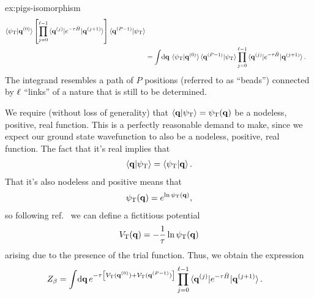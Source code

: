 \begin{DefAnswer}{ex:pigs-isomorphism}
\begin{subequations}
\begin{align}
			\braket{\psiT | \vec{q}\bead{0}}
			\left[ \prod_{j=0}^{\links - 1}
				\braket{\vec{q}\bead{j} | e^{-\tau \hat{H}} | \vec{q}\bead{j+1}}
			\right]
			\braket{\vec{q}\bead{P-1} | \psiT} \\
		&= \int\! \dif \vec{q} \,
			\braket{\psiT | \vec{q}\bead{0}}
			\braket{\vec{q}\bead{P-1} | \psiT}
			\prod_{j=0}^{\links - 1}
				\braket{\vec{q}\bead{j} | e^{-\tau \hat{H}} | \vec{q}\bead{j+1}}.
	\end{align}
	\end{subequations}
	The integrand resembles a path of $P$ positions (referred to as ``beads'') connected by $\ell$ ``links'' of a nature that is still to be determined.

	We require (without loss of generality) that $\braket{\bm{\mathbf{q}} | \psi_\mathrm{T}} = \psi_\mathrm{T}(\bm{\mathbf{q}})$ be a nodeless, positive, real function.
	This is a perfectly reasonable demand to make, since we expect our ground state wavefunction to also be a nodeless, positive, real function.
	The fact that it's real implies that
	\begin{align}
		\braket{\bm{\mathbf{q}} | \psi_\mathrm{T}} = \braket{\psi_\mathrm{T} | \bm{\mathbf{q}}}.
	\end{align}
	That it's also nodeless and positive means that
	\begin{align}
		\psi_\mathrm{T}(\bm{\mathbf{q}}) = e^{\ln{\psi_\mathrm{T}(\bm{\mathbf{q}})}},
	\end{align}
	so following ref.~\cite{schmidt2014inclusion} we can define a fictitious potential
	\begin{align}
		V_\mathrm{T}(\bm{\mathbf{q}}) = -\frac{1}{\tau} \ln{\psi_\mathrm{T}(\bm{\mathbf{q}})}
	\end{align}
	arising due to the presence of the trial function.
	Thus, we obtain the expression
	\begin{align}
		Z_\beta
		&= \int\! \dif \vec{q} \,
			e^{-\tau \left[ \VT(\vec{q}\bead{0}) + \VT(\vec{q}\bead{P-1}) \right]}
			\prod_{j=0}^{\links - 1}
				\braket{\vec{q}\bead{j} | e^{-\tau \hat{H}} | \vec{q}\bead{j+1}}.
	\end{align}


\end{DefAnswer}
